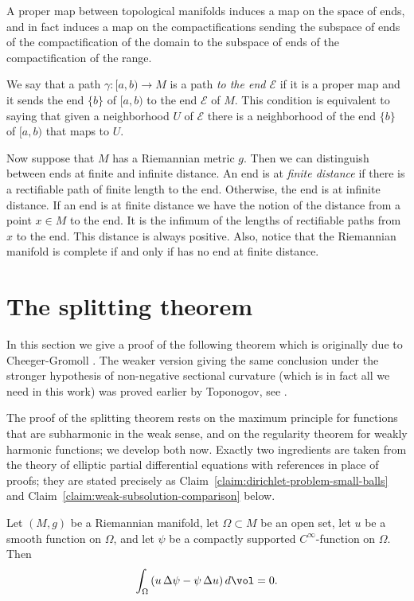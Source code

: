 A proper map between topological manifolds induces a map on the
space of ends, and in fact induces a map on the compactifications
sending the subspace of ends of the compactification of the domain
to the subspace of ends of the compactification of the range.


We say that a path $\gamma\colon [a,b)\to M$ is a path {\em to the
end ${\mathcal E}$} if it is a proper map and it sends the end
$\{b\}$ of $[a,b)$ to the end ${\mathcal E}$ of $M$. This condition
is equivalent to saying that given a neighborhood $U$ of ${\mathcal
E}$ there is a neighborhood of the end $\{b\}$ of $[a,b)$ that maps
to $U$.

Now suppose that $M$ has a Riemannian metric $g$. Then we can
distinguish between ends at finite and infinite distance. An end is
at {\em finite distance} if there is a rectifiable path of finite
length to the end. Otherwise, the end is at infinite distance. If an
end is at finite distance we have the notion of the distance from a
point $x\in M$ to the end. It is the infimum of the lengths of
rectifiable paths from $x$ to the end. This distance is always
positive. Also, notice that the Riemannian manifold is complete if
and only if has no end at finite distance.

\section{The splitting theorem}

In this section we give a proof of the following theorem which is
originally due to Cheeger-Gromoll \cite{CheegerGromoll2}. The weaker
version giving the same conclusion under the stronger hypothesis of
non-negative sectional curvature (which is in fact all we need in
this work) was proved earlier by Toponogov, see \cite{Toponogov}.

The proof of the splitting theorem rests on the maximum principle
for functions that are subharmonic in the weak sense, and on the
regularity theorem for weakly harmonic functions; we develop both
now. Exactly two ingredients are taken from the theory of elliptic
partial differential equations with references in place of proofs;
they are stated precisely as
Claim~\ref{claim:dirichlet-problem-small-balls} and
Claim~\ref{claim:weak-subsolution-comparison} below.

\begin{lemma}
\label{lem:green-identity-compact-support}
Let $(M,g)$ be a Riemannian manifold, let $\Omega\subset M$ be an
open set, let $u$ be a smooth function on $\Omega$, and let $\psi$
be a compactly supported $C^\infty$-function on $\Omega$. Then
$$\int_\Omega\left(u\,\Delta\psi-\psi\,\Delta u\right)d\vol=0.$$
\end{lemma}

